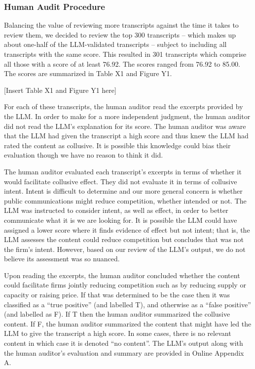\subsubsection{Human Audit Procedure}
Balancing the value of reviewing more transcripts against the time it takes to review them, we decided to review the top 300 transcripts – which makes up about one-half of the LLM-validated transcripts -- subject to including all transcripts with the same score. This resulted in 301 transcripts which comprise all those with a score of at least 76.92. The scores ranged from 76.92 to 85.00. The scores are summarized in Table X1 and Figure Y1.

\begin{center}
    [Insert Table X1 and Figure Y1 here]
\end{center}

For each of these transcripts, the human auditor read the excerpts provided by the LLM. In order to make for a more independent judgment, the human auditor did not read the LLM’s explanation for its score. The human auditor was aware that the LLM had given the transcript a high score and thus knew the LLM had rated the content as collusive. It is possible this knowledge could bias their evaluation though we have no reason to think it did.

The human auditor evaluated each transcript’s excerpts in terms of whether it would facilitate collusive effect. They did not evaluate it in terms of collusive intent. Intent is difficult to determine and our more general concern is whether public communications might reduce competition, whether intended or not. The LLM was instructed to consider intent, as well as effect, in order to better communicate what it is we are looking for. It is possible the LLM could have assigned a lower score where it finds evidence of effect but not intent; that is, the LLM assesses the content could reduce competition but concludes that was not the firm’s intent. However, based on our review of the LLM’s output, we do not believe its assessment was so nuanced.

Upon reading the excerpts, the human auditor concluded whether the content could facilitate firms jointly reducing competition such as by reducing supply or capacity or raising price. If that was determined to be the case then it was classified as a ``true positive'' (and labelled T), and otherwise as a ``false positive'' (and labelled as F). If T then the human auditor summarized the collusive content. If F, the human auditor summarized the content that might have led the LLM to give the transcript a high score. In some cases, there is no relevant content in which case it is denoted ``no content''. The LLM’s output along with the human auditor’s evaluation and summary are provided in Online Appendix A.

